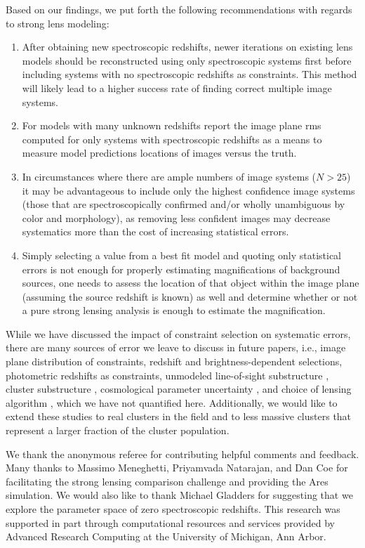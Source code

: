 Based on our findings, we put forth the following recommendations with regards to strong lens modeling:

\begin{enumerate}
\item  After obtaining new spectroscopic redshifts, newer iterations on existing lens models should be reconstructed using only spectroscopic systems first before including systems with no spectroscopic redshifts as constraints. This method will likely lead to a higher success rate of finding correct multiple image systems.
\item For models with many unknown redshifts report the image plane rms computed for only systems with spectroscopic redshifts as a means to measure model predictions locations of images versus the truth.
\item In circumstances where there are ample numbers of image systems ($N>25$) it may be advantageous to include only the highest confidence image systems (those that are spectroscopically confirmed and/or wholly unambiguous by color and morphology), as removing less confident images may decrease systematics more than the cost of increasing statistical errors.
\item Simply selecting a value from a best fit model and quoting only statistical errors is not enough for properly estimating magnifications of background sources, one needs to assess the location of that object within the image plane (assuming the source redshift is known) as well and determine whether or not a pure strong lensing analysis is enough to estimate the magnification.
\end{enumerate}

While we have discussed the impact of constraint selection on systematic errors, there are many sources of error we leave to discuss in future papers, i.e., image plane distribution of constraints, redshift and brightness-dependent selections, photometric redshifts as constraints, unmodeled line-of-sight substructure \citep[e.g.,][]{DAloisio:2014vl}, cluster substructure \citep[e.g.,][]{Limousin:2007fk}, cosmological parameter uncertainty \citep[e.g.,][]{Bayliss:2015lr}, and choice of lensing algorithm \citep{Meneghetti:2016xe}, which we have not quantified here. Additionally, we would like to extend these studies to real clusters in the field and to less massive clusters that represent a larger fraction of the cluster population.

\vspace{24pt}

We thank the anonymous referee for contributing helpful comments and feedback. Many thanks to Massimo Meneghetti, Priyamvada Natarajan, and Dan Coe for facilitating the strong lensing comparison challenge and providing the Ares simulation. We would also like to thank Michael Gladders for suggesting that we explore the parameter space of zero spectroscopic redshifts. This research was supported in part through computational resources and services provided by Advanced Research Computing at the University of Michigan, Ann Arbor.
